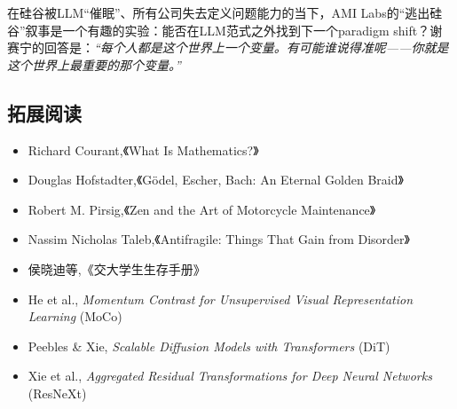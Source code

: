 \documentclass[a4paper]{article}
\begin{document}
在硅谷被LLM``催眠''、所有公司失去定义问题能力的当下，AMI Labs的``逃出硅谷''叙事是一个有趣的实验：能否在LLM范式之外找到下一个paradigm shift？谢赛宁的回答是：\textit{``每个人都是这个世界上一个变量。有可能谁说得准呢——你就是这个世界上最重要的那个变量。''}

\subsection{拓展阅读}

\begin{itemize}
    \item Richard Courant,《What Is Mathematics?》
    \item Douglas Hofstadter,《G\"odel, Escher, Bach: An Eternal Golden Braid》
    \item Robert M. Pirsig,《Zen and the Art of Motorcycle Maintenance》
    \item Nassim Nicholas Taleb,《Antifragile: Things That Gain from Disorder》
    \item 侯晓迪等,《交大学生生存手册》
    \item He et al., \textit{Momentum Contrast for Unsupervised Visual Representation Learning} (MoCo)
    \item Peebles \& Xie, \textit{Scalable Diffusion Models with Transformers} (DiT)
    \item Xie et al., \textit{Aggregated Residual Transformations for Deep Neural Networks} (ResNeXt)
\end{itemize}

\end{document}
